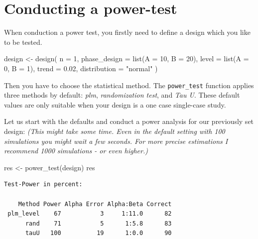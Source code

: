 \documentclass[
  letterpaper,
  DIV=11,
  numbers=noendperiod]{scrreprt}
\newenvironment{Shaded}{\begin{snugshade}}{\end{snugshade}}
\newcommand{\AttributeTok}[1]{\textcolor[rgb]{0.40,0.45,0.13}{#1}}
\newcommand{\DecValTok}[1]{\textcolor[rgb]{0.68,0.00,0.00}{#1}}
\newcommand{\FloatTok}[1]{\textcolor[rgb]{0.68,0.00,0.00}{#1}}
\newcommand{\FunctionTok}[1]{\textcolor[rgb]{0.28,0.35,0.67}{#1}}
\newcommand{\NormalTok}[1]{\textcolor[rgb]{0.00,0.23,0.31}{#1}}
\newcommand{\OtherTok}[1]{\textcolor[rgb]{0.00,0.23,0.31}{#1}}
\newcommand{\StringTok}[1]{\textcolor[rgb]{0.13,0.47,0.30}{#1}}
\begin{document}
\hypertarget{conducting-a-power-test}{%
\section{Conducting a power-test}\label{conducting-a-power-test}}

When conduction a power test, you firstly need to define a design which
you like to be tested.

\begin{Shaded}
\begin{Highlighting}[]
\NormalTok{design }\OtherTok{\textless{}{-}} \FunctionTok{design}\NormalTok{(}
  \AttributeTok{n =} \DecValTok{1}\NormalTok{,}
  \AttributeTok{phase\_design =} \FunctionTok{list}\NormalTok{(}\AttributeTok{A =} \DecValTok{10}\NormalTok{, }\AttributeTok{B =} \DecValTok{20}\NormalTok{),}
  \AttributeTok{level =} \FunctionTok{list}\NormalTok{(}\AttributeTok{A =} \DecValTok{0}\NormalTok{, }\AttributeTok{B =} \DecValTok{1}\NormalTok{),}
  \AttributeTok{trend =} \FloatTok{0.02}\NormalTok{,}
  \AttributeTok{distribution =} \StringTok{"normal"}
\NormalTok{)}
\end{Highlighting}
\end{Shaded}

Then you have to choose the statistical method. The \texttt{power\_test}
function applies three methods by default: \emph{plm},
\emph{randomization test}, and \emph{Tau U}. These default values are
only suitable when your design is a one case single-case study.

Let us start with the defaults and conduct a power analysis for our
previously set design: \emph{(This might take some time. Even in the
default setting with 100 simulations you might wait a few seconds. For
more precise estimations I recommend 1000 simulations - or even
higher.)}

\begin{Shaded}
\begin{Highlighting}[]
\NormalTok{res }\OtherTok{\textless{}{-}} \FunctionTok{power\_test}\NormalTok{(design)}
\NormalTok{res}
\end{Highlighting}
\end{Shaded}

\begin{verbatim}
Test-Power in percent:

    Method Power Alpha Error Alpha:Beta Correct
 plm_level    67           3     1:11.0      82
      rand    71           5      1:5.8      83
      tauU   100          19      1:0.0      90
\end{verbatim}
\end{document}
